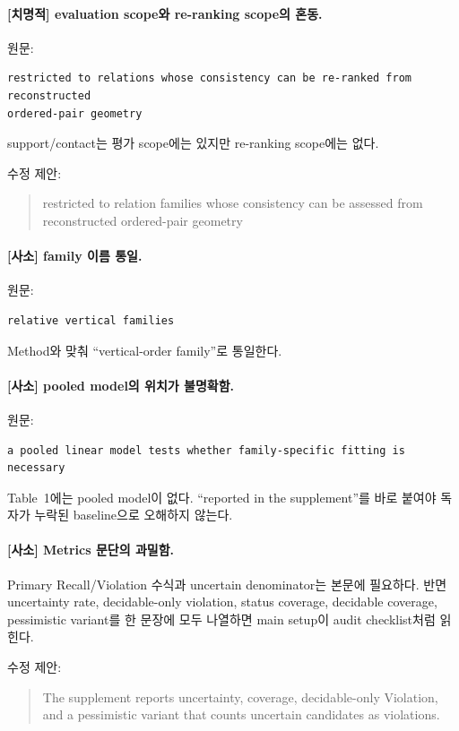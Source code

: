 \documentclass[11pt]{article}
\newcommand{\fatal}{\textbf{\textcolor{fatalred}{[치명적]}}}
\newcommand{\minor}{\textbf{\textcolor{minorblue}{[사소]}}}
\begin{document}
\paragraph{\fatal{} evaluation scope와 re-ranking scope의 혼동.}

원문:
\begin{verbatim}
restricted to relations whose consistency can be re-ranked from reconstructed
ordered-pair geometry
\end{verbatim}

support/contact는 평가 scope에는 있지만 re-ranking scope에는 없다.

수정 제안:
\begin{quote}
restricted to relation families whose consistency can be assessed from
reconstructed ordered-pair geometry
\end{quote}

\paragraph{\minor{} family 이름 통일.}

원문:
\begin{verbatim}
relative vertical families
\end{verbatim}

Method와 맞춰 ``vertical-order family''로 통일한다.

\paragraph{\minor{} pooled model의 위치가 불명확함.}

원문:
\begin{verbatim}
a pooled linear model tests whether family-specific fitting is necessary
\end{verbatim}

Table~1에는 pooled model이 없다. ``reported in the supplement''를 바로 붙여야 독자가
누락된 baseline으로 오해하지 않는다.

\paragraph{\minor{} Metrics 문단의 과밀함.}

Primary Recall/Violation 수식과 uncertain denominator는 본문에 필요하다. 반면
uncertainty rate, decidable-only violation, status coverage, decidable coverage,
pessimistic variant를 한 문장에 모두 나열하면 main setup이 audit checklist처럼 읽힌다.

수정 제안:
\begin{quote}
The supplement reports uncertainty, coverage, decidable-only Violation, and a
pessimistic variant that counts uncertain candidates as violations.
\end{quote}
\end{document}
